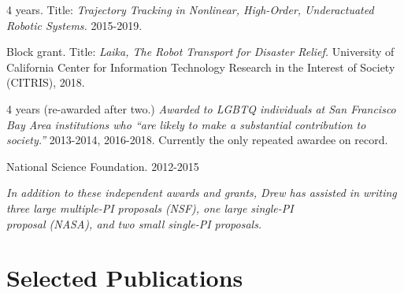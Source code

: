 \documentclass[letterpaper]{deedy-resume} %
\begin{document}
\vspace{0.2cm}


\begin{etaremune}

\item {} 4 years. Title: {\it Trajectory Tracking in Nonlinear, High-Order, Underactuated Robotic Systems.} 2015-2019.
  
\item{} Block grant. Title: {\it Laika, The Robot Transport for Disaster Relief.} University of California Center for Information Technology Research in the Interest of Society (CITRIS), 2018.

\item {} 4 years (re-awarded after two.) {\it Awarded to LGBTQ individuals at San Francisco Bay Area institutions who ``are likely to make a substantial contribution to society.''} 2013-2014, 2016-2018. Currently the only repeated awardee on record.

\item {} National Science Foundation. 2012-2015

\end{etaremune}

\vspace{-0.2cm}
\hspace{1cm} {\small \it *In addition to these independent awards and grants, Drew has assisted in writing three large multiple-PI proposals (NSF), one large single-PI\\ \hspace{1cm} proposal (NASA), and two small single-PI proposals.}



\vspace{0.2cm}
\section{Selected Publications}
\vspace{0.2cm}
\end{document}
